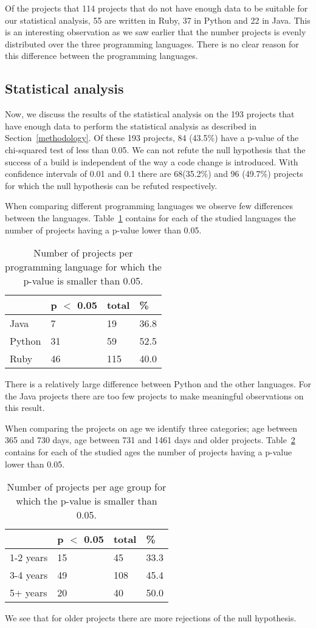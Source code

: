 Of the projects that 114 projects that do not have enough data to be suitable for our statistical analysis, 55 are written in Ruby, 37 in Python and 22 in Java.
This is an interesting observation as we saw earlier that the number projects is evenly distributed over the three programming languages.
There is no clear reason for this difference between the programming languages.

\subsection{Statistical analysis}
Now, we discuss the results of the statistical analysis on the 193 projects that have enough data to perform the statistical analysis as described in Section~\ref{methodology}.
Of these 193 projects, 84 (43.5\%) have a p-value of the chi-squared test of less than 0.05. 
We can not refute the null hypothesis that the success of a build is independent of the way a code change is introduced.
With confidence intervals of 0.01 and 0.1 there are 68(35.2\%) and 96 (49.7\%) projects for which the null hypothesis can be refuted respectively.

When comparing different programming languages we observe few differences between the languages.
Table~\ref{tab:p-for-lang} contains for each of the studied languages the number of projects having a p-value lower than 0.05.
\begin{table}[h]
\begin{tabular}{ l | l l l}
 & p $<$ 0.05 & total & \%\\
\hline
Java & 7 & 19 & 36.8\\
Python & 31 & 59 & 52.5 \\
Ruby & 46 & 115 & 40.0
\end{tabular}
\caption{Number of projects per programming language for which the p-value is smaller than 0.05.}
\label{tab:p-for-lang}
\end{table}
There is a relatively large difference between Python and the other languages. 
For the Java projects there are too few projects to make meaningful observations on this result.

When comparing the projects on age we identify three categories; age between 365 and 730 days, age between 731 and 1461 days and older projects.
Table~\ref{tab:p-for-age} contains for each of the studied ages the number of projects having a p-value lower than 0.05.
\begin{table}[h]
\begin{tabular}{ l | l l l}
 & p $<$ 0.05 & total & \%\\
\hline
1-2 years & 15 & 45 & 33.3\\
3-4 years & 49 & 108 & 45.4 \\
5+ years & 20 & 40 & 50.0
\end{tabular}
\caption{Number of projects per age group for which the p-value is smaller than 0.05.}
\label{tab:p-for-age}
\end{table}
We see that for older projects there are more rejections of the null hypothesis. 

